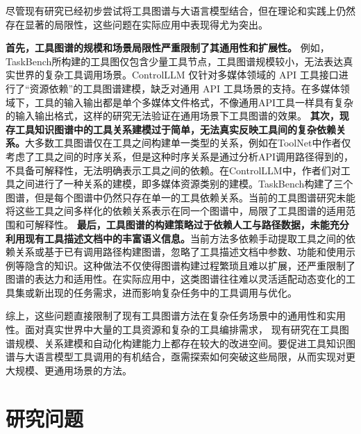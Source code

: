 

尽管现有研究已经初步尝试将工具图谱与大语言模型结合，但在理论和实践上仍然存在显著的局限性，这些问题在实际应用中表现得尤为突出。

\textbf{首先，工具图谱的规模和场景局限性严重限制了其通用性和扩展性。}
\noindent 例如，TaskBench\cite{shen2023taskbench}所构建的工具图仅包含少量工具节点，工具图谱规模较小，无法表达真实世界的复杂工具调用场景。ControlLLM\cite{Liu2023a} 仅针对多媒体领域的 API 工具接口进行了“资源依赖”的工具图谱建模，缺乏对通用 API 工具场景的支持。在多媒体领域下，工具的输入输出都是单个多媒体文件格式，不像通用API工具一样具有复杂的输入输出格式，这样的研究无法验证在通用场景下工具图谱的效果。
\textbf{其次，现存工具知识图谱中的工具关系建模过于简单，无法真实反映工具间的复杂依赖关系。}大多数工具图谱仅在工具之间构建单一类型的关系，例如在ToolNet中作者仅考虑了工具之间的时序关系\cite{Liu2024}，但是这种时序关系是通过分析API调用路径得到的，不具备可解释性，无法明确表示工具之间的依赖。在ControlLLM\cite{Liu2023a}中，作者们对工具之间进行了一种关系的建模，即多媒体资源类别的建模。TaskBench\cite{shen2023taskbench}构建了三个图谱，但是每个图谱中仍然只存在单一的工具依赖关系。当前的工具图谱研究未能将这些工具之间多样化的依赖关系表示在同一个图谱中，局限了工具图谱的适用范围和可解释性。
\textbf{最后，工具图谱的构建策略过于依赖人工与路径数据，未能充分利用现有工具描述文档中的丰富语义信息。}当前方法多依赖手动提取工具之间的依赖关系或基于已有调用路径构建图谱，忽略了工具描述文档中参数、功能和使用示例等隐含的知识。这种做法不仅使得图谱构建过程繁琐且难以扩展，还严重限制了图谱的表达力和适用性。在实际应用中，这类图谱往往难以灵活适配动态变化的工具集或新出现的任务需求，进而影响复杂任务中的工具调用与优化。

综上，这些问题直接限制了现有工具图谱方法在复杂任务场景中的通用性和实用性。面对真实世界中大量的工具资源和复杂的工具编排需求，
现有研究在工具图谱规模、关系建模和自动化构建能力上都存在较大的改进空间。要促进工具知识图谱与大语言模型工具调用的有机结合，亟需探索如何突破这些局限，从而实现对更大规模、更通用场景的方法。

\section{研究问题}

